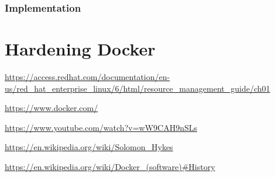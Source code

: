 \documentclass[a4paper,12pt]{article}
\begin{document}
\subsubsection{Implementation}

\newpage

\section{Hardening Docker}

\newpage

\begin{thebibliography}{99}
%
%

 
\url{https://access.redhat.com/documentation/en-us/red_hat_enterprise_linux/6/html/resource_management_guide/ch01}

\url{https://www.docker.com/}

\url{https://www.youtube.com/watch?v=wW9CAH9nSLs}

\url{https://en.wikipedia.org/wiki/Solomon_Hykes}

\url{https://en.wikipedia.org/wiki/Docker_(software)#History}

\end{thebibliography}
\end{document}
